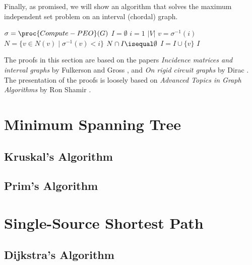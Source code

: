 Finally, as promised, we will show an algorithm that solves the maximum independent set problem on an interval (chordal) graph.

\begin{codebox}
    \li $\sigma = \proc{Compute-PEO}(G)$
    \li $I = \emptyset$
    \li \For $i = 1$ \To $|V|$ \Do
        \li $v = \sigma^{-1}(i)$
        \li $N = \{v \in N(v) \mid \sigma^{-1}(v) < i \}$
        \li \If $N \cap I \isequal \emptyset$ \Then
            \li $I = I \cup \{v\}$
        \End
    \End
    \li \Return $I$
\end{codebox}

The proofs in this section are based on the papers \textit{Incidence matrices and interval graphs} by Fulkerson and Gross \cite{Fulkerson1965-Chordal-Graph}, and \textit{On rigid circuit graphs} by Dirac \cite{Dirac1961-Rigid-Circuit-Graph}. The presentation of the proofs is loosely based on \textit{Advanced Topics in Graph Algorithms} by Ron Shamir \cite{shamir}.

\section{Minimum Spanning Tree}

\subsection{Kruskal's Algorithm}

\subsection{Prim's Algorithm}

\section{Single-Source Shortest Path}

\subsection{Dijkstra's Algorithm}